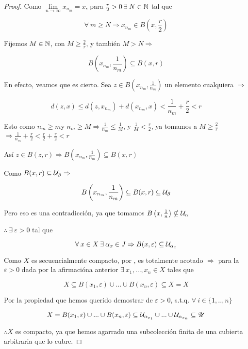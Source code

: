 \begin{proof}
    Como $\lim\limits_{n \to \infty} x_{n_m} = x$, para $\frac{r}{2} > 0 \: \exists \: N \in \mathbb{N}$ tal que

    $$\forall \: m \geqslant N \Rightarrow x_{n_m} \in B \left( x, \frac{r}{2} \right)$$

    Fijemos $M \in \mathbb{N}$, con $M \geqslant \frac{2}{r}$, y también $M > N \Rightarrow$

    $$B \left( x_{n_m}, \frac{1}{n_m} \right) \subseteq B(x,r)$$

    En efecto, veamos que es cierto. Sea $z \in B \left( x_{n_m}, \frac{1}{n_m} \right)$ un elemento cualquiera $\Rightarrow$

    $$d(z,x) \leqslant d(z, x_{n_m}) + d(x_{n_m}, x) < \frac{1}{n_m} + \frac{r}{2} < r$$

    Esto como $n_m \geqslant m$y $n_m \geqslant M \Rightarrow \frac{1}{n_m} \leqslant \frac{1}{M}$, y $\frac{1}{M} < \frac{r}{2}$, ya tomamos a $M \geqslant \frac{2}{r}$ $\Rightarrow \frac{1}{n_m} + \frac{r}{2} < \frac{r}{2} + \frac{r}{2} < r$

    Así $z \in B(z,r) \Rightarrow B \left( x_{n_m}, \frac{1}{n_m} \right) \subseteq B(x,r)$

    Como $B(x,r) \subseteq \mathcal{U}_\beta \Rightarrow$

    $$ B \left( x_{n_m}, \frac{1}{n_m} \right) \subseteq B(x,r) \subseteq \mathcal{U}_\beta $$

    Pero eso es una contradicción, ya que tomamos $B\left(x, \frac{1}{n} \right) \nsubseteq \mathcal{U}_\alpha$

    $\therefore \: \exists \: \varepsilon > 0$ tal que 

    $$\forall \: x \in X \: \exists \: \alpha_x \in J \Rightarrow B(x, \varepsilon) \subseteq \mathcal{U}_{\alpha_x}$$

    Como $X$ es secuencialmente compacto, por , es totalmente acotado $\Rightarrow$ para la $\varepsilon > 0$ dada por la afirmacióna anterior $\exists \: x_1, ..., x_n \in X$ tales que

    $$X \subseteq B(x_1, \varepsilon) \cup ... \cup B(x_n, \varepsilon) \subseteq X = X$$

    Por la propiedad que hemos querido demostrar de $\varepsilon > 0$, s.t.q. $\forall \: i \in \{ 1, .., n \}$

    $$X = B(x_1, \varepsilon) \cup ... \cup B(x_n, \varepsilon) \subseteq \mathcal{U}_{\alpha_{x_1}} \cup ... \cup \mathcal{U}_{\alpha_{x_n}} \subseteq \mathscr{U}$$

    $\therefore X$ es compacto, ya que hemos agarrado una subcolección finita de una cubierta arbitraria que lo cubre. 
\end{proof}

